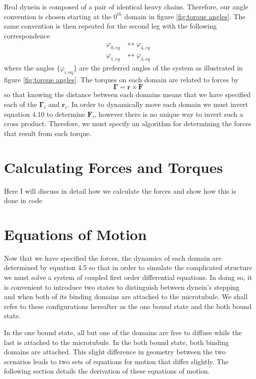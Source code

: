 	Real dynein is composed of a pair of identical heavy chains. Therefore, our angle convention is chosen starting at the $0^{th}$ domain in figure \ref{fig:torque angles}. The same convention is then repeated for the second leg with the following correspondence 
	\begin{align}
		\varphi_{0,eq} &\longleftrightarrow \varphi_{4,eq} \\ 
		\varphi_{1,eq} &\longleftrightarrow \varphi_{3,eq}
	\end{align}
	where the angles $\{\varphi_{i, \text{eq}}\}$ are the preferred angles of the system as illustrated in figure \ref{fig:torque angles}. The torques on each domain are related to forces by 
	\begin{equation}
		\mathbf{\Gamma} = \mathbf{r}\times\mathbf{F}
	\end{equation}
	so that knowing the distance between each domains means that we have specified each of the $\mathbf{\Gamma}_i$ and $\mathbf{r}_i$. In order to dynamically move each domain we must invert equation 4.10 to determine $\mathbf{F}_i$, however there is no unique way to invert such a cross product. Therefore, we must specify an algorithm for determining the forces that result from each torque. 
	
	\section{Calculating Forces and Torques}
	Here I will discuss in detail how we calculate the forces and show how this is done in code
	
	
	
	\section{Equations of Motion}
	Now that we have specified the forces, the dynamics of each domain are determined by equation 4.5 so that in order to simulate the complicated structure we must solve a system of coupled first order differential equations. In doing so, it is convenient to introduce two states to distinguish between dynein's stepping and when both of its binding domains are attached to the microtubule. We shall refer to these configurations hereafter as the one bound state and the both bound state. 
	
	In the one bound state, all but one of the domains are free to diffuse while the last is attached to the microtubule. In the both bound state, both binding domains are attached. This slight difference in geometry between the two scenarios leads to two sets of equations for motion that differ slightly. The following section details the derivation of these equations of motion. 
	
